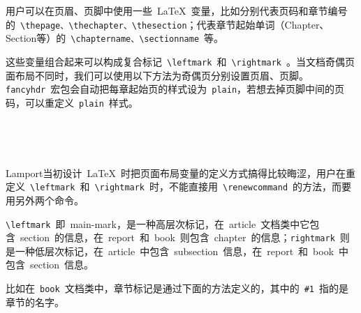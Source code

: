 用户可以在页眉、页脚中使用一些~\LaTeX~变量，比如分别代表页码和章节编号的~\verb|\thepage、\thechapter、\thesection|；代表章节起始单词（Chapter、Section等）的~\verb|\chaptername、\sectionname|~等。

这些变量组合起来可以构成复合标记~\verb|\leftmark|~和~\verb|\rightmark|~。当文档奇偶页面布局不同时，我们可以使用以下方法为奇偶页分别设置页眉、页脚。\verb|fancyhdr|~宏包会自动把每章起始页的样式设为~\verb|plain|，若想去掉页脚中间的页码，可以重定义~\verb|plain|~样式。

\begin{code}
\pagestyle{fancy}
\fancyhf{}                  %
\fancyhead[LE,RO]{\thepage} %
\fancyhead[RE]{\leftmark}   %
\fancyhead[LO]{\rightmark}  %
\end{code}

\ \\

\ \\

Lamport当初设计~\LaTeX~时把页面布局变量的定义方式搞得比较晦涩，用户在重定义~\verb|\leftmark|~和~\verb|\rightmark|~时，不能直接用~\verb|\renewcommand|~的方法，而要用另外两个命令。

\begin{code}
\end{code}

\verb|\leftmark|~即~main-mark，是一种高层次标记，在~article~文档类中它包含~section~的信息，在~report~和~book~则包含~chapter~的信息；\verb|rightmark|~则是一种低层次标记，在~article~中包含~subsection~信息，在~report~和~book~中包含~section~信息。

比如在~\verb|book|~文档类中，章节标记是通过下面的方法定义的，其中的~\verb|#1|~指的是章节的名字。

\begin{code}
\renewcommand\chaptermark[1]{\markboth{\chaptername \thechapter. 
    #1}{}}
\renewcommand\sectionmark[1]{\markright{\thesection. #1}}
\end{code}




\newpage
